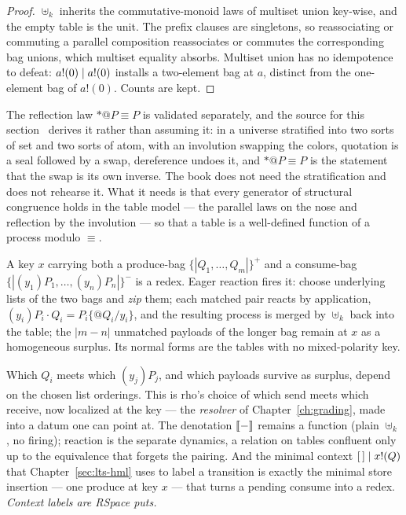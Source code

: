 \begin{proof}
$\uplus_k$ inherits the commutative-monoid laws of multiset union key-wise, and the empty
table is the unit. The prefix clauses are singletons, so reassociating or commuting a
parallel composition reassociates or commutes the corresponding bag unions, which multiset
equality absorbs. Multiset union has no idempotence to defeat: $a!(0) \mid a!(0)$ installs a
two-element bag at $a$, distinct from the one-element bag of $a!(0)$. Counts are kept.
\end{proof}

The reflection law $*@P \equiv P$ is validated separately, and the source for this
section~\cite{qcs} derives it rather than assuming it: in a universe stratified into two
sorts of set and two sorts of atom, with an involution swapping the colors, quotation is a
seal followed by a swap, dereference undoes it, and $*@P \equiv P$ is the statement that
the swap is its own inverse. The book does not need the stratification and does not rehearse
it. What it needs is that every generator of structural congruence holds in the table
model --- the parallel laws on the nose and reflection by the involution --- so that a
table is a well-defined function of a process modulo $\equiv$.

\begin{definition}
\label{rs:def:zip}
A key $x$ carrying both a produce-bag $\{\!|Q_1,\dots,Q_m|\!\}^{+}$ and a consume-bag
$\{\!|(y_1)P_1,\dots,(y_n)P_n|\!\}^{-}$ is a redex. Eager reaction fires it: choose
underlying lists of the two bags and \emph{zip} them; each matched pair reacts by
application, $(y_i)P_i \cdot Q_i = P_i\{@Q_i/y_i\}$, and the resulting process is merged
by $\uplus_k$ back into the table; the $|m-n|$ unmatched payloads of the longer bag remain
at $x$ as a homogeneous surplus. Its normal forms are the tables with no mixed-polarity key.
\end{definition}

Which $Q_i$ meets which $(y_j)P_j$, and which payloads survive as surplus, depend on the
chosen list orderings. This is rho's choice of which send meets which receive, now
localized at the key --- the \emph{resolver} of Chapter~\ref{ch:grading}, made into a
datum one can point at. The denotation $\llbracket - \rrbracket$ remains a function (plain $\uplus_k$, no
firing); reaction is the separate dynamics, a relation on tables confluent only up to the
equivalence that forgets the pairing. And the minimal context $[\,]\mid x!(Q)$ that
Chapter~\ref{sec:lts-hml} uses to label a transition is exactly the minimal store insertion
--- one produce at key $x$ --- that turns a pending consume into a redex. \emph{Context
labels are RSpace puts.}


